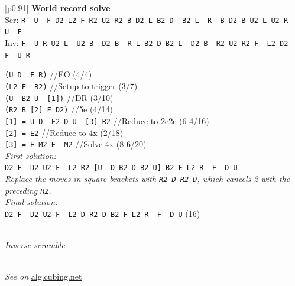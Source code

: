 \documentclass[11pt,a4paper]{book}
\newcommand{\p}{\textquotesingle}
\newcommand{\m}{\texttt}
\newcommand{\ps}{\p\,\,}
\newcommand{\comment}[1]{{\color{gray}\quad//#1}}
\begin{document}
\bigskip
\begin{tabular}{|p{}|}
\hline
\textbf{World record solve}\\
\hline
Scr: \m{R\ps U\ps F D2 L2 F R2 U2 R2 B D2 L B2 D\ps B2 L\ps R\ps B D2 B U2 L U2 R\ps U\ps F}\\
Inv: \m{F\ps U R U2 L\ps U2 B\ps D2 B\ps R L B2 D B2 L\ps D2 B\ps R2 U2 R2 F\ps L2 D2 F\ps U R}\\
\hline
\begin{minipage}[l]{0.70\textwidth}
\m{(U D\ps F R)} \comment{EO (4/4)}\\
\m{(L2 F\ps B2)} \comment{Setup to trigger (3/7)}\\
\m{(U\ps B2 U\ps [1])} \comment{DR (3/10)}\\
\m{(R2 B [2] F D2)} \comment{5e (4/14)}\\

\m{[1] = U D\ps F2 D U\ps [3] R2} \comment{Reduce to 2e2e (6-4/16)}\\
\m{[2] = E2} \comment{Reduce to 4x (2/18)}\\
\m{[3] = E M2 E\ps M2} \comment{Solve 4x (8-6/20)}\\

\emph{First solution:}\\
\m{D2 F\ps D2 U2 F\ps L2 R2 {[U\ps D B2 D B2 U]} B2 F L2 R\ps F\ps D U\p}\\
\emph{Replace the moves in square brackets with \m{R2 D R2 D}, which cancels 2 with the preceding \m{R2}}.\\

\emph{Final solution:}\\
\m{D2 F\ps D2 U2 F\ps L2 D R2 D B2 F L2 R\ps F\ps D U\p} (16)\\
\end{minipage}
\begin{minipage}[c]{0.2\textwidth}
{\begin{center}\\ \emph{Inverse scramble}
\end{center}}
\end{minipage}\\
\hline
\emph{See on }\href{https://alg.cubing.net/?alg=U_D-_F_R_\%2F\%2FEO_(4\%2F4)\%0AL2_F-_B2_\%2F\%2FSetup_to_trigger_(3\%2F7)\%0AU-_B2_U-_\%2F\%2FDR_(3\%2F10)\%0AR2_B_F_D2_\%2F\%2F5e_(4\%2F14)&setup=F-_U_R_U2_L-_U2_B-_D2_B-_R_L_B2_D_B2_L-_D2_B-_R2_U2_R2_F-_L2_D2_F-_U_R_\%2F\%2FInverse_scramble}{alg.cubing.net}\\
\hline
\end{tabular}
\bigskip
\end{document}
